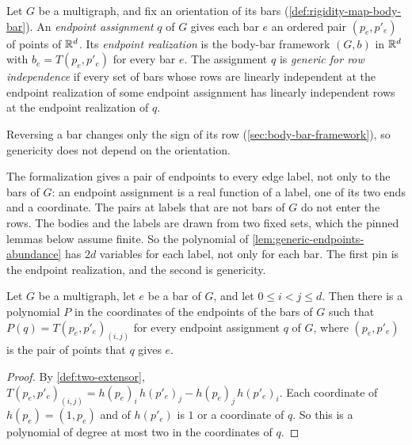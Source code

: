 \begin{definition}
  \label{def:generic-endpoints}
  \leanok
  Let $G$ be a multigraph, and fix an orientation of its bars
  (\cref{def:rigidity-map-body-bar}). An \emph{endpoint assignment}
  $q$ of $G$ gives each bar $e$ an ordered pair $(p_e, p'_e)$ of
  points of ${\mathbb{R}}^d$. Its \emph{endpoint realization} is the body-bar
  framework $(G, b)$ in ${\mathbb{R}}^d$ with $b_e = T(p_e, p'_e)$ for every bar
  $e$. The assignment $q$ is \emph{generic for row independence} if
  every set of bars whose rows are linearly independent at the
  endpoint realization of some endpoint assignment has linearly
  independent rows at the endpoint realization of $q$.
\end{definition}

Reversing a bar changes only the sign of its row
(\cref{sec:body-bar-framework}), so genericity does not depend on the
orientation.

\begin{fmlnote}
  The formalization gives a pair of endpoints to every edge label, not
  only to the bars of $G$: an endpoint assignment is a real function of
  a label, one of its two ends and a coordinate. The pairs at labels
  that are not bars of $G$ do not enter the rows. The bodies and the
  labels are drawn from two fixed sets, which the pinned lemmas below
  assume finite. So the polynomial of
  \cref{lem:generic-endpoints-abundance} has $2d$ variables for each
  label, not only for each bar. The first pin is the endpoint
  realization, and the second is genericity.
\end{fmlnote}

\begin{lemma}
  \label{lem:two-extensor-polynomial}
  \leanok
  Let $G$ be a multigraph, let $e$ be a bar of $G$, and let
  $0 \le i < j \le d$. Then there is a polynomial $P$ in the
  coordinates of the endpoints of the bars of $G$ such that
  $P(q) = T(p_e, p'_e)_{(i,j)}$ for every endpoint assignment $q$ of
  $G$, where $(p_e, p'_e)$ is the pair of points that $q$ gives $e$.
\end{lemma}
\begin{proof}
  \leanok
  By \cref{def:two-extensor},
  $T(p_e, p'_e)_{(i,j)} = h(p_e)_i\, h(p'_e)_j - h(p_e)_j\, h(p'_e)_i$.
  Each coordinate of $h(p_e) = (1, p_e)$ and of $h(p'_e)$ is $1$ or a
  coordinate of $q$. So this is a polynomial of degree at most two in
  the coordinates of $q$.
\end{proof}

